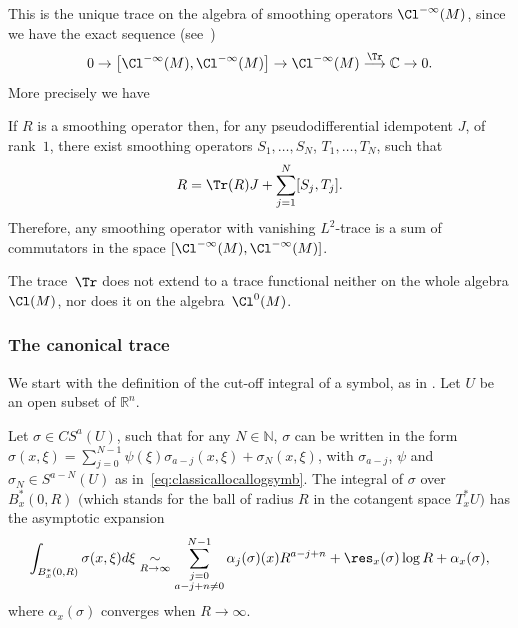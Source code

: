 This is the unique trace on the algebra of smoothing operators $\Cl^{-\infty}(M)$, since we have the exact sequence (see~\cite{guilleminfourier})
\[
0\to\big[\Cl^{-\infty}(M),\Cl^{-\infty}(M)\big]\to \Cl^{-\infty}(M)\overset{\Tr}{\longrightarrow}\mathbb{C}\to0.
\]
More precisely we have

\begin{theorem}\label{smooth}
If $R$ is a smoothing operator then, for any pseudodifferential idempotent $J$, of rank~$1$, there exist smoothing operators $S_1,\ldots,S_{N}$, $T_1,\ldots,T_{N}$, such that
\[
R=\Tr(R)J+\sum_{j=1}^{N}[S_j,T_j].
\]
Therefore, any smoothing operator with vanishing $L^2$-trace is a sum of commutators in the space $[\Cl^{-\infty}(M),\Cl^{-\infty}(M)]$.
\end{theorem}

\begin{proposition}\label{nocont}
The trace~$\Tr$ does not extend to a trace functional neither on the whole algebra $\Cl(M)$, nor does it on the algebra~$\Cl^0(M)$.
\end{proposition}

\subsubsection{The canonical trace}\label{subsectioncanonicaltrace}

We start with the def\/inition of the cut-of\/f integral of a symbol, as in \cite{sylvie}. Let $U$ be an open subset of $\mathbb{R}^n$.

\begin{proposition}
Let $\sigma\in CS^a(U)$, such that for any $N\in\mathbb{N}$, $\sigma$ can be written in the form $ \sigma(x,\xi) =\sum\limits_{j=0}^{N-1}\psi(\xi)\sigma_{a-j}(x,\xi)+\sigma_N(x,\xi)$, with $\sigma_{a-j}$, $\psi$ and $\sigma_N\in S^{a-N}(U)$ as in~\eqref{eq:classicallocallogsymb}. The integral of $\sigma$ over $B^{*}_x(0,R)$ $($which stands for the ball of radius $R$ in the cotangent space $T^{*}_xU)$ has the asymptotic expansion
\[
\int_{B^{*}_x(0,R)}\sigma(x,\xi)d\xi \underset{R\to\infty}{\sim}\sum_{\substack{j=0\\ a-j+n\not=0}}^{N-1}\alpha_j(\sigma)(x)R^{a-j+n} +\res_x(\sigma)\log R+\alpha_x(\sigma),
\]
where $\alpha_x(\sigma)$ converges when $R\to\infty$.
\end{proposition}

